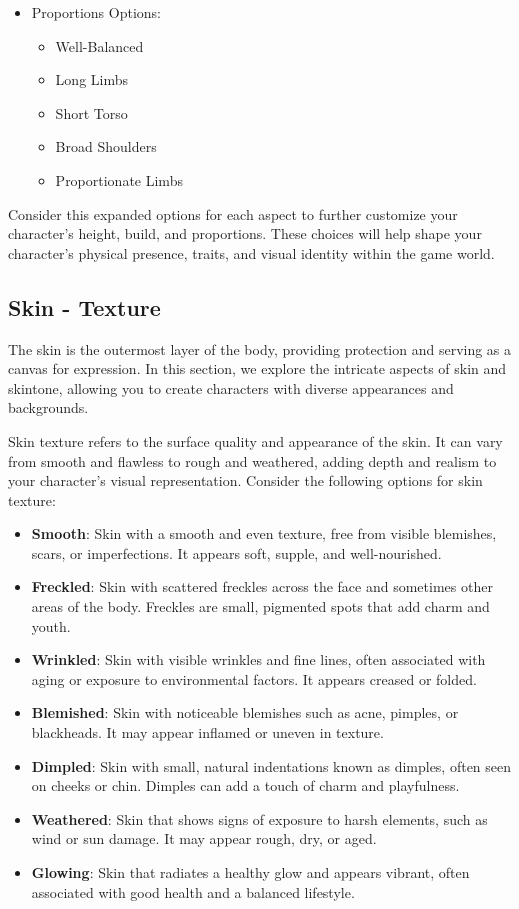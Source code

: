 \documentclass[12pt]{book}
\begin{document}
\begin{itemize}
    \item Proportions Options:
    \begin{itemize}
        \item Well-Balanced
        \item Long Limbs
        \item Short Torso
        \item Broad Shoulders
        \item Proportionate Limbs
    \end{itemize}
\end{itemize}

Consider this expanded options for each aspect to further customize your character's height, build, and proportions. These choices will help shape your character's physical presence, traits, and visual identity within the game world.

\subsection{\textbf{Skin  - Texture}}

The skin is the outermost layer of the body, providing protection and serving as a canvas for expression. In this section, we explore the intricate aspects of skin and skintone, allowing you to create characters with diverse appearances and backgrounds.

Skin texture refers to the surface quality and appearance of the skin. It can vary from smooth and flawless to rough and weathered, adding depth and realism to your character's visual representation. Consider the following options for skin texture:

\begin{itemize}
    \item \textbf{Smooth}: Skin with a smooth and even texture, free from visible blemishes, scars, or imperfections. It appears soft, supple, and well-nourished.
    \item \textbf{Freckled}: Skin with scattered freckles across the face and sometimes other areas of the body. Freckles are small, pigmented spots that add charm and youth.
    \item \textbf{Wrinkled}: Skin with visible wrinkles and fine lines, often associated with aging or exposure to environmental factors. It appears creased or folded.
    \item \textbf{Blemished}: Skin with noticeable blemishes such as acne, pimples, or blackheads. It may appear inflamed or uneven in texture.
    \item \textbf{Dimpled}: Skin with small, natural indentations known as dimples, often seen on cheeks or chin. Dimples can add a touch of charm and playfulness.
    \item \textbf{Weathered}: Skin that shows signs of exposure to harsh elements, such as wind or sun damage. It may appear rough, dry, or aged.
    \item \textbf{Glowing}: Skin that radiates a healthy glow and appears vibrant, often associated with good health and a balanced lifestyle.
\end{itemize}
\end{document}
